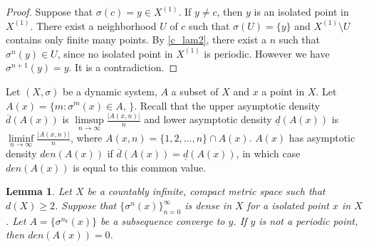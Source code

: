 \documentclass[a4paper,10pt]{amsart}
\newtheorem{lemma}{Lemma}[section]
\begin{document}
\begin{proof}
    Suppose that $\sigma(c) = y \in X^{(1)}$. If $y \neq c$, then $y$ is an
    isolated point in $X^{(1)}$. There exist a neighborhood $U$ of $c$ such
    that $\sigma(U) = \{ y \}$ and $X^{(1)} \setminus U$ contains only finite
    many points. By \cref{c_lam2}, there exist a $n$ such that $\sigma^{n}(y)
    \in U$, since no isolated point in $X^{(1)}$ is periodic. However
    we have $\sigma^{n+1}(y) = y$. It is a contradiction.
\end{proof}

Let $(X, \sigma)$ be a dynamic system, $A$ a subset of $X$ 
and $x$ a point in $X$. Let 
$A(x) = \{m : \sigma^{m}(x) \in A \mbox{, }\}$. Recall that 
the upper asymptotic density $\overline{d}(A(x))$ is 
$\limsup\limits_{n\rightarrow \infty} \frac{|A(x,n)|}{n}$ and 
lower asymptotic density $\underline{d}(A(x))$ is 
$\liminf \limits_{n\rightarrow \infty} \frac{|A(x,n)|}{n}$,
where $A(x,n) = \{1, 2, \ldots, n\} \cap A(x)$. $A(x)$ has 
asymptotic density $den(A(x))$ if $\overline{d}(A(x))=\underline{d}(A(x))$,
in which case $den(A(x))$ is equal to this common value.


\begin{lemma} \label{c_lam4}
   Let $X$ be a countably infinite, compact metric space such that $d(X) \geq 2$.
   Suppose that $\{ \sigma^{n}(x) \}_{n=0}^{\infty}$ 
   is dense in $X$ for a isolated point $x$ in $X$. Let $A = \{\sigma^{n_k}(x)\}$
   be a subsequence converge to $y$. If $y$ is not a periodic point, then 
   $den(A(x)) = 0$.
\end{lemma}
\end{document}
